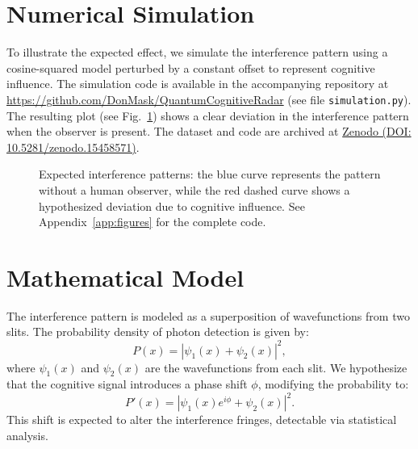 \documentclass[12pt]{IEEEtran}
\begin{document}
\section{Numerical Simulation}
To illustrate the expected effect, we simulate the interference pattern using a cosine-squared model perturbed by a constant offset to represent cognitive influence. The simulation code is available in the accompanying repository at \url{https://github.com/DonMask/QuantumCognitiveRadar} (see file \texttt{simulation.py}). The resulting plot (see Fig.~\ref{fig:interference}) shows a clear deviation in the interference pattern when the observer is present. The dataset and code are archived at \href{https://doi.org/10.5281/zenodo.15458571}{Zenodo (DOI: 10.5281/zenodo.15458571)}.

\begin{figure}[!t]
\centering
{}
\caption{Expected interference patterns: the blue curve represents the pattern without a human observer, while the red dashed curve shows a hypothesized deviation due to cognitive influence. See Appendix~\ref{app:figures} for the complete code.}
\label{fig:interference}
\end{figure}

\section{Mathematical Model}
The interference pattern is modeled as a superposition of wavefunctions from two slits. The probability density of photon detection is given by:
\begin{equation}
P(x) = \left| \psi_1(x) + \psi_2(x) \right|^2,
\end{equation}
where \(\psi_1(x)\) and \(\psi_2(x)\) are the wavefunctions from each slit. We hypothesize that the cognitive signal introduces a phase shift \(\phi\), modifying the probability to:
\begin{equation}
P'(x) = \left| \psi_1(x)e^{i\phi} + \psi_2(x) \right|^2.
\end{equation}
This shift is expected to alter the interference fringes, detectable via statistical analysis.
\end{document}
